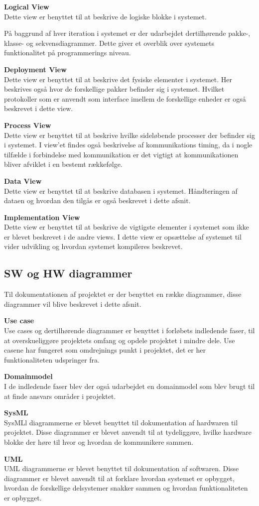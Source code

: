 \textbf{Logical View}\\
Dette view er benyttet til at beskrive de logiske blokke i systemet.

På baggrund af hver iteration i systemet er der udarbejdet dertilhørende pakke-, klasse- og sekvensdiagrammer. Dette giver et overblik over systemets funktionalitet på programmerings niveau.

\newpage

\textbf{Deployment View}\\
Dette view er benyttet til at beskrive det fysiske elementer i systemet. Her beskrives også hvor de forskellige pakker befinder sig i systemet. Hvilket protokoller som er anvendt som interface imellem de forskellige enheder er også beskrevet i dette view.

\textbf{Process View}\\
Dette view er benyttet til at beskrive hvilke sideløbende processer der befinder sig i systemet. I view'et findes også beskrivelse af kommunikations timing, da i nogle tilfælde i forbindelse med kommunikation er det vigtigt at kommunikationen bliver afviklet i en bestemt rækkefølge.

\textbf{Data View}\\
Dette view er benyttet til at beskrive databasen i systemet. Håndteringen af dataen og hvordan den tilgås er også beskrevet i dette afsnit. 

\textbf{Implementation View}\\
Dette view er benyttet til at beskrive de vigtigste elementer i systemet som ikke er blevet beskrevet i de andre views. I dette view er opsættelse af systemet til vider udvikling og hvordan systemet kompileres beskrevet.

\subsection{SW og HW diagrammer}
Til dokumentationen af projektet er der benyttet en række diagrammer, disse diagrammer vil blive beskrevet i dette afsnit.

\textbf{Use case}\\
Use cases og dertilhørende diagrammer er benyttet i forløbets indledende faser, til at overskueliggøre projektets omfang og opdele projektet i mindre dele. Use casene har fungeret som omdrejnings punkt i projektet, det er her funktionaliteten udspringer fra.

\textbf{Domainmodel}\\
I de indledende faser blev der også udarbejdet en domainmodel som blev brugt til at finde ansvars områder i projektet.

\textbf{SysML}\\
SysMLl diagrammerne er blevet benyttet til dokumentation af hardwaren til projektet. Disse diagrammer er blevet anvendt til at tydeliggøre, hvilke hardware blokke der høre til hvor og hvordan de kommunikere sammen.  

\textbf{UML}\\
UML diagrammerne er blevet  benyttet til dokumentation af softwaren. Disse diagrammer er blevet anvendt til at forklare hvordan systemet er opbygget, hvordan de forskellige delsystemer snakker sammen og hvordan funktionaliteten er opbygget.